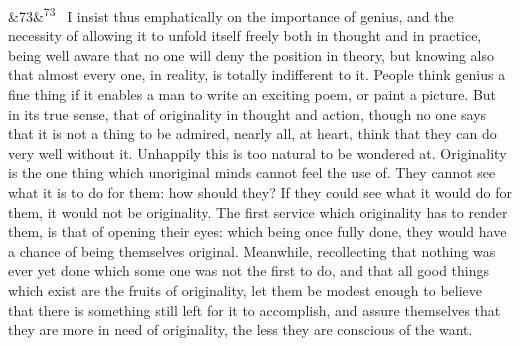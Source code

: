 \documentclass[12pt]{article}
\newcommand{\para}[1][]{\par\noindent\ifx&#1&\else\textsuperscript{\footnotesize #1}~\fi}
\begin{document}
\para[73] I insist thus emphatically on the importance of genius, and the necessity of allowing it to unfold itself freely both in thought and in practice, being well aware that no one will deny the position in theory, but knowing also that almost every one, in reality, is totally indifferent to it. People think genius a fine thing if it enables a man to write an exciting poem, or paint a picture. But in its true sense, that of originality in thought and action, though no one says that it is not a thing to be admired, nearly all, at heart, think that they can do very well without it. Unhappily this is too natural to be wondered at. Originality is the one thing which unoriginal minds cannot feel the use of. They cannot see what it is to do for them: how should they? If they could see what it would do for them, it would not be originality. The first service which originality has to render them, is that of opening their eyes: which being once fully done, they would have a chance of being themselves original. Meanwhile, recollecting that nothing was ever yet done which some one was not the first to do, and that all good things which exist are the fruits of originality, let them be modest enough to believe that there is something still left for it to accomplish, and assure themselves that they are more in need of originality, the less they are conscious of the want.
\end{document}
